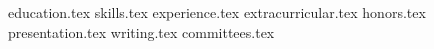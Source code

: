 \documentclass[11pt, a4paper]{awesome-cv}
\newcommand*{\sectiondir}{cv/}
\begin{document}
\makecvheader

{education.tex}
{skills.tex}
{experience.tex}
{extracurricular.tex}
{honors.tex}
{presentation.tex}
{writing.tex}
{committees.tex}
\end{document}
